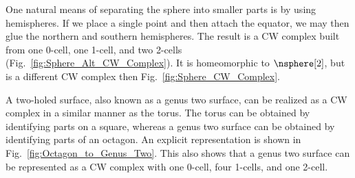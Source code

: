     \hfill
    \par\vspace{2.5ex}
    \hfill
    \begin{minipage}[t]{0.62\textwidth}
        \begin{example}
            One natural means of separating the sphere into smaller
            parts is by using hemispheres. If we place a single point
            and then attach the equator, we may then glue the northern
            and southern hemispheres. The result is a CW complex built
            from one 0-cell, one 1-cell, and two 2-cells
            (Fig.~\ref{fig:Sphere_Alt_CW_Complex}). It is homeomorphic
            to $\nsphere[2]$, but is a different CW complex then
            Fig.~\ref{fig:Sphere_CW_Complex}.
        \end{example}
    \end{minipage}
    \par\vspace{2.5ex}
    \begin{example}
        A two-holed surface, also known as a genus two surface, can be
        realized as a CW complex in a similar manner as the torus. The
        torus can be obtained by identifying parts on a square, whereas
        a genus two surface can be obtained by identifying parts of an
        octagon. An explicit representation is shown in
        Fig.~\ref{fig:Octagon_to_Genus_Two}. This also shows that a
        genus two surface can be represented as a CW complex with one
        0-cell, four 1-cells, and one 2-cell.
    \end{example}

